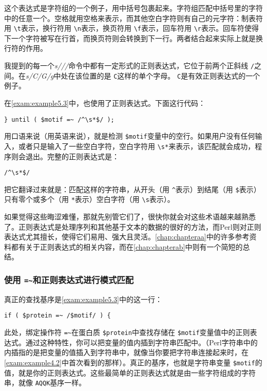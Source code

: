 这个表达式是字符组的一个例子，用中括号包裹起来。字符组匹配中括号里的字符中的任意一个。空格就用空格来表示，而其他空白字符则有自己的元字符：制表符用 \verb|\t|表示，换行符用 \verb|\n|表示，换页符用 \verb|\f|表示，回车符用 \verb|\r|表示。回车符使得下一个字符被写在行首，而换页符则会转换到下一行。两者结合起来实际上就是换行符的作用。

我提到的每一个\textit{s///}命令中都有一定形式的正则表达式，它位于前两个正斜线 \verb|/|之间。在\textit{s/C/G/g}中处在该位置的是 \verb|C|这样的单个字母。 \verb|C|是有效正则表达式的一个例子。

在\autoref{exam:example5.3}中，也使用了正则表达式。下面这行代码：

\begin{lstlisting}
} until ( $motif =~ /^\s*$/ );
\end{lstlisting}

用口语来说（用英语来说），就是检测 \verb|$motif|变量中的空行。如果用户没有任何输入，或者只是输入了一些空白字符，空白字符用 \verb|\s*|来表示，该匹配就会成功，程序则会退出。完整的正则表达式是：

\begin{lstlisting}
/^\s*$/
\end{lstlisting}

把它翻译过来就是：匹配这样的字符串，从开头（用 \verb|^|表示）到结尾（用 \verb|$|表示）只有零个或多个（用 \verb|*|表示）空白字符（用 \verb|\s|表示）。

如果觉得这些晦涩难懂，那就先别管它们了，很快你就会对这些术语越来越熟悉了。正则表达式是处理序列和其他基于文本的数据的很好的方法，而Perl则对正则表达式尤其擅长，使得它们易用、强大且灵活。\autoref{chap:chapteraa}中的许多参考资料都有关于正则表达式的相关内容，而在\autoref{chap:chapterab}中则有一个简短的总结。

\cprotect \subsubsection{使用 \verb|=~|和正则表达式进行模式匹配}
真正的查找基序是\autoref{exam:example5.3}中的这一行： 

\begin{lstlisting}
if ( $protein =~ /$motif/ ) {
\end{lstlisting}

此处，绑定操作符 \verb|=~|在蛋白质 \verb|$protein|中查找存储在 \verb|$motif|变量值中的正则表达式。通过这种特性，你可以把变量的值内插到字符串匹配中。（Perl字符串中的内插指的是把变量的值插入到字符串中，就像当你要把字符串连接起来时，在\autoref{exam:example4.2}中首次看到的那样）。真正的基序，也就是字符串变量 \verb|$motif|的值，就是你的正则表达式。这些最简单的正则表达式就是由一些字符组成的字符串，就像 \verb|AQQK|基序一样。

